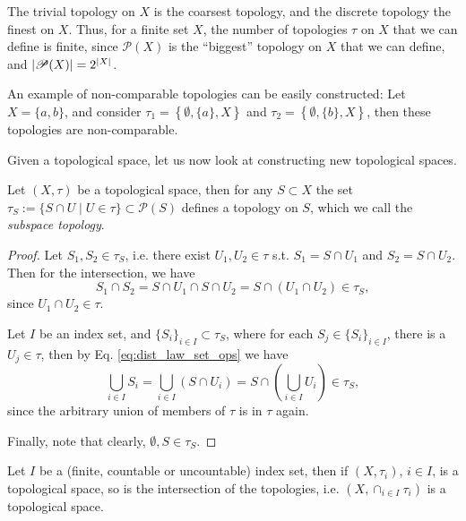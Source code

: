 \begin{remark}
	The trivial topology on $X$ is the coarsest topology, and the discrete topology the finest on $X$. Thus, for a finite set $X$, the number of topologies $\tau$ on $X$ that we can define is finite, since $\mathscr P(X)$ is the \enquote{biggest} topology on $X$ that we can define, and $\left\vert \mathscr P(X) \right\vert = 2^{\left\vert X \right\vert}$.
\end{remark}

\begin{remark}
	An example of non-comparable topologies can be easily constructed: Let $X = \{a, b\}$, and consider $\tau_1 = \left\{\emptyset, \{a\}, X\right\}$ and $\tau_2 = \left\{\emptyset, \{b\}, X\right\}$, then these topologies are non-comparable.
\end{remark}

Given a topological space, let us now look at constructing new topological spaces.

\begin{theorem}\label{thrm:subspace_topology}
	Let $(X, \tau)$ be a topological space, then for any $S\subset X$ the set
	$\tau_S := \{S \cap U \mid U\in \tau\}\subset \mathcal P(S)$ defines a topology on $S$, which we call the \textit{subspace topology}.
\end{theorem}

\begin{proof}
	Let $S_1, S_2\in \tau_S$, i.e. there exist $U_1, U_2\in \tau$ s.t. $S_1 = S\cap U_1$ and $S_2 = S\cap U_2$. Then for the intersection, we have 
	$$S_1 \cap S_2 = S\cap U_1\cap S\cap U_2 = S\cap (U_1\cap U_2) \in \tau_S, $$ since $U_1\cap U_2\in \tau$. 
	
	Let $I$ be an index set, and $\{S_i\}_{i\in I}\subset \tau_S$, where for each $S_j\in \{S_i\}_{i\in I}$, there is a $U_j\in \tau$, then by Eq. \eqref{eq:dist_law_set_ops} we have 
	$$\bigcup_{i\in I}S_i = \bigcup_{i\in I}\left(S\cap U_i\right) = S\cap \left(\bigcup_{i\in I}U_i\right)\in \tau_S,$$
	since the arbitrary union of members of $\tau$ is in $\tau$ again.
	
	Finally, note that clearly, $\emptyset, S\in \tau_S$.
\end{proof}

\begin{theorem}\label{thrm:arbitrary_intersec_tops_top}
	Let $I$ be a (finite, countable or uncountable) index set, then if $(X, \tau_i)$, $i\in I$, is a topological space, so is the intersection of the topologies, i.e. $\left(X, \cap_{i\in I}\tau_i\right)$ is a topological space.
\end{theorem}

